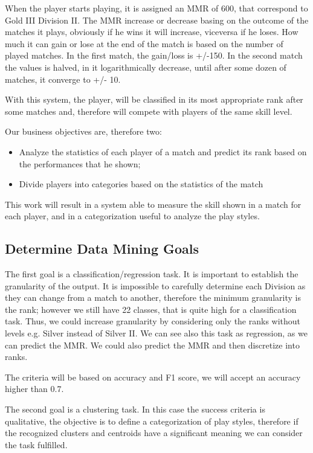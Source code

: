 When the player starts playing, it is assigned an MMR of 600, that correspond to Gold III Division II. The MMR increase or decrease basing on the outcome of the matches it plays, obviously if he wins it will increase, viceversa if he loses. How much it can gain or lose at the end of the match is based on the number of played matches. In the first match, the gain/loss is +/-150. In the second match the values is halved, in it logarithmically decrease, until after some dozen of matches, it converge to +/- 10.

With this system, the player, will be classified in its most appropriate rank after some matches and, therefore will compete with players of the same skill level.

Our business objectives are, therefore two:
\begin{itemize}
    \item Analyze the statistics of each player of a match and predict its rank based on the performances that he shown;
    \item Divide players into categories based on the statistics of the match
\end{itemize}


This work will result in a system able to measure the skill shown in a match for each player, and in a categorization useful to analyze the play styles.

\subsection{Determine Data Mining Goals}

The first goal is a classification/regression task. It is important to establish the granularity of the output. It is impossible to carefully determine each Division as they can change from a match to another, therefore the minimum granularity is the rank; however we still have 22 classes, that is quite high for a classification task. Thus, we could increase granularity by considering only the ranks without levels e.g. Silver instead of Silver II. We can see also this task as regression, as we can predict the MMR. We could also predict the MMR and then discretize into ranks.

The criteria will be based on accuracy and F1 score, we will accept an accuracy higher than 0.7.

The second goal is a clustering task. In this case the success criteria is qualitative, the objective is to define a categorization of play styles, therefore if the recognized clusters and centroids have a significant meaning we can consider the task fulfilled.
